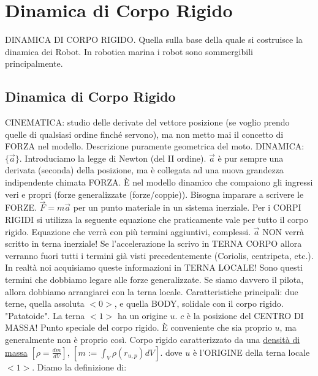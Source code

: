 
\chapter{Dinamica di Corpo Rigido}
\label{cap:rb}

DINAMICA DI CORPO RIGIDO. Quella sulla base della quale si costruisce la dinamica dei Robot. In robotica marina i robot sono sommergibili principalmente.

\section{Dinamica di Corpo Rigido}

CINEMATICA: studio delle derivate del vettore posizione (se voglio prendo quelle di qualsiasi ordine finché servono), ma non metto mai il concetto di FORZA nel modello. Descrizione puramente geometrica del moto. DINAMICA: $\{\vec{a}\}$. Introduciamo la legge di Newton (del II ordine). $\vec{a}$ è pur sempre una derivata (seconda) della posizione, ma è collegata ad una nuova grandezza indipendente chimata FORZA. \`E nel modello dinamico che compaiono gli ingressi veri e propri (forze generalizzate (forze/coppie)). Bisogna imparare a scrivere le FORZE. $\vec{F}=m\vec{a}$ per un punto materiale in un sistema inerziale. Per i CORPI RIGIDI si utilizza la seguente equazione che praticamente vale per tutto il corpo rigido. Equazione che verrà con più termini aggiuntivi, complessi. $\vec{a}$ NON verrà scritto in terna inerziale! Se l'accelerazione la scrivo in TERNA CORPO allora verranno fuori tutti i termini già visti precedentemente (Coriolis, centripeta, etc.). In realtà noi acquisiamo queste informazioni in TERNA LOCALE! Sono questi termini che dobbiamo legare alle forze generalizzate. Se siamo davvero il pilota, allora dobbiamo arrangiarci con la terna locale. Caratteristiche principali: due terne, quella assoluta $<0>$, e quella BODY, solidale con il corpo rigido. "Patatoide". La terna $<1>$ ha un origine $u$. $c$ è la posizione del CENTRO DI MASSA! Punto speciale del corpo rigido. \`E conveniente che sia proprio $u$, ma generalmente non è proprio così. Corpo rigido caratterizzato da una \underline{densità di massa} $[\rho=\frac{dm}{dV}]$, $[m := \int_V{\rho(r_{u,p})dV}]$. dove $u$ è l'ORIGINE della terna locale $<1>$. Diamo la definizione di:

